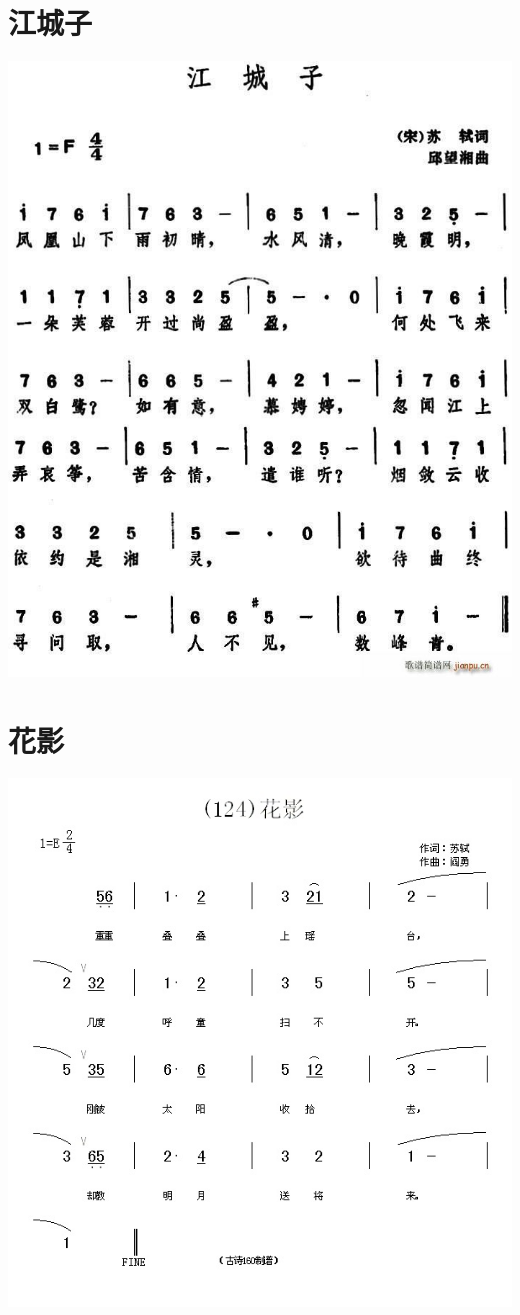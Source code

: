 \documentclass[cn,pad,chinesefont=nofont]{elegantbook}
\begin{document}
\section{江城子}
    \includegraphics[width=\textwidth]{dongxiao/20200627-苏轼-江城子.jpg} 
\section{花影}
    \includegraphics[width=\textwidth]{dongxiao/20200627-苏轼-花影.jpg} 
\end{document}
